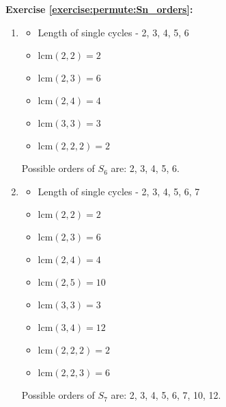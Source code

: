 \noindent\textbf{Exercise \ref{exercise:permute:Sn_orders}:} %
\begin{enumerate}[{a.}]
\item
	\begin{multicols}{2}
	\begin{itemize}
	\item
	Length of single cycles - 2, 3, 4, 5, 6
	
	\item
	$\mbox{lcm}(2, 2) = 2$
	
	\item
	$\mbox{lcm}(2, 3) = 6$
	
	\item
	$\mbox{lcm}(2, 4) = 4$
	
	\item
	$\mbox{lcm}(3, 3) = 3$
	
	\item
	$\mbox{lcm}(2, 2, 2) = 2$
	\end{itemize}
	\end{multicols}
Possible orders of $S_6$ are: 2, 3, 4, 5, 6.
	
\item
	\begin{multicols}{2}
	\begin{itemize}
	\item
	Length of single cycles - 2, 3, 4, 5, 6, 7
	
	\item
	$\mbox{lcm}(2, 2) = 2$
	
	\item
	$\mbox{lcm}(2, 3) = 6$
	
	\item
	$\mbox{lcm}(2, 4) = 4$
	
	\item
	$\mbox{lcm}(2, 5) = 10$
	
	\item
	$\mbox{lcm}(3, 3) = 3$
	
	\item
	$\mbox{lcm}(3, 4) = 12$
	
	\item
	$\mbox{lcm}(2, 2, 2) = 2$
	
	\item
	$\mbox{lcm}(2, 2, 3) = 6$
	\end{itemize}
	\end{multicols}
Possible orders of $S_7$ are: 2, 3, 4, 5, 6, 7, 10, 12.


\end{enumerate}
